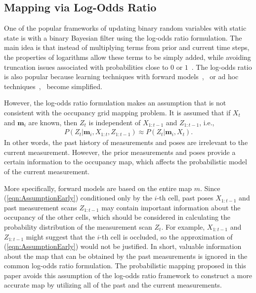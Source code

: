 \documentclass[smallextended]{svjour3}       %
\newcommand{\refeqn}[1]{(\ref{eqn:#1})}
\begin{document}
\subsection{Mapping via Log-Odds Ratio}

One of the popular frameworks of updating binary random variables with static state is with a binary Bayesian filter using the log-odds ratio formulation.
The main idea is that instead of multiplying terms from prior and current time steps, the properties of logarithms allow these terms to be simply added, while avoiding truncation issues associated with probabilities close to $0$ or $1$~\cite{ThrBurFox05}.
The log-odds ratio is also popular because learning techniques with forward models~\cite{Thr01},~\cite{Thr03} or ad hoc techniques~\cite{MorElf85},~\cite{Elf89} become simplified.%

However, the log-odds ratio formulation makes an assumption that is not consistent with the occupancy grid mapping problem. It is assumed that if $X_t$ and $\mathbf{m}_i$ are known, then $Z_t$ is independent of $X_{1:t-1}$ and $Z_{1:t-1}$, i.e.,
\begin{align}
\label{eqn:AssumptionEarly}
P(Z_t|\mathbf{m}_i,X_{1:t},Z_{1:t-1})\approx P(Z_t|\mathbf{m}_i,X_t).
\end{align}
In other words, the past history of measurements and poses are irrelevant to the current measurement. However, the prior measurements and poses provide a certain information to the occupancy map, which affects the probabilistic model of the current measurement. 

More specifically, forward models are based on the entire map $m$. Since \refeqn{AssumptionEarly} conditioned only by the $i$-th cell, past poses $X_{1:t-1}$ and past measurement scans $Z_{1:t-1}$ may contain important information about the occupancy of the other cells, which should be considered in calculating the probability distribution of the measurement scan $Z_t$. For example, $X_{1:t-1}$ and $Z_{1:t-1}$ might suggest that the $i$-th cell is occluded, so the approximation of \refeqn{AssumptionEarly} would not be justified. In short, valuable information about the map that can be obtained by the past measurements is ignored in the common log-odds ratio formulation. The probabilistic mapping proposed in this paper avoids this assumption of the log-odds ratio framework to construct a more accurate map by utilizing all of the past and the current measurements. 
\end{document}
